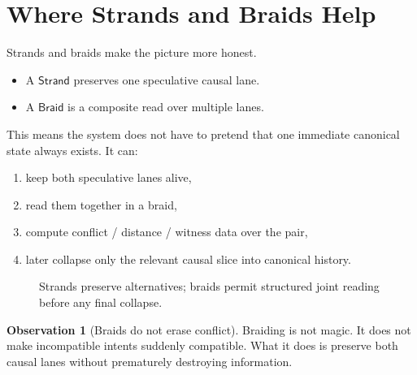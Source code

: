 \documentclass[11pt]{article}
\newcommand{\Strand}{\ensuremath{\mathsf{Strand}}}
\newcommand{\Braid}{\ensuremath{\mathsf{Braid}}}
\theoremstyle{definition}
\newtheorem{observation}{Observation}
\begin{document}
\section{Where Strands and Braids Help}

Strands and braids make the picture more honest.

\begin{itemize}[leftmargin=2em]
\item A \Strand{} preserves one speculative causal lane.
\item A \Braid{} is a composite read over multiple lanes.
\end{itemize}

This means the system does not have to pretend that one immediate canonical
state always exists. It can:
\begin{enumerate}[leftmargin=2em]
\item keep both speculative lanes alive,
\item read them together in a braid,
\item compute conflict / distance / witness data over the pair,
\item later collapse only the relevant causal slice into canonical history.
\end{enumerate}

\begin{figure}[h]
\centering
{}
\caption{Strands preserve alternatives; braids permit structured joint reading before any final collapse.}
\end{figure}

\begin{observation}[Braids do not erase conflict]
Braiding is not magic. It does not make incompatible intents suddenly
compatible. What it does is preserve both causal lanes without prematurely
destroying information.
\end{observation}
\end{document}
